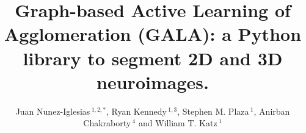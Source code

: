 \documentclass{frontiersSCNS} %
\def\firstAuthorLast{Nunez-Iglesias {et~al.}} %
\def\Authors{Juan Nunez-Iglesias\,$^{1,2,*}$, Ryan Kennedy\,$^{1,3}$, Stephen M. Plaza\,$^{1}$, Anirban Chakraborty\,$^{4}$ and William T. Katz\,$^1$}
\begin{document}
\onecolumn
{}

\title[learned agglomeration]{Graph-based Active Learning of Agglomeration (GALA): a Python library to segment 2D and 3D neuroimages.}
\author[\firstAuthorLast]{\Authors}
\address{}
\correspondance{}
\extraAuth{}%

\maketitle

\end{document}
